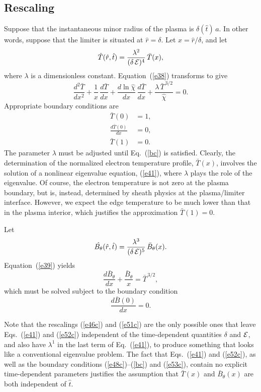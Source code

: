 \documentclass{iopjournal}
\begin{document}
\subsection{Rescaling}
Suppose that the instantaneous minor radius of the plasma is $\delta(\hat{t})\,a$. In other words, suppose that the limiter
is situated at $\hat{r}= \delta$. Let $x=\hat{r}/\delta$, and let
\begin{equation}\label{e46c}
\hat{T}(\hat{r},\hat{t}) = \frac{\lambda^2}{(\delta\,{\cal E})^4}\,\bar{T}(x),
\end{equation}
where $\lambda$ is a dimensionless constant. 
Equation~(\ref{e38}) transforms to give
\begin{equation}\label{e41}
\frac{d^2\bar{T}}{dx^2} + \frac{1}{x}\,\frac{d\bar{T}}{dx} + \frac{d\ln\hat{\chi}}{dx}\,\frac{d\bar{T}}{dx} + \frac{\lambda\,\bar{T}^{\,3/2}}{\hat{\chi}}=0.
\end{equation}
Appropriate boundary conditions are 
\begin{align}\label{e48c}
\bar{T}(0) &=1,\\[0.5ex]
\frac{d\bar{T}(0)}{dx}& = 0,\\[0.5ex]
\bar{T}(1) &= 0.\label{bc}
\end{align}
The parameter $\lambda$ must be adjusted until Eq.~(\ref{bc}) is satisfied. Clearly, the determination of the normalized electron temperature profile, $\bar{T}(x)$, 
involves the solution of a nonlinear eigenvalue equation, (\ref{e41}), where $\lambda$ plays the role of the eigenvalue. Of course, the electron temperature is not zero at the
plasma boundary, but is, instead, determined by sheath physics at the plasma/limiter interface. However, we expect the edge temperature to
be much lower than that in the plasma interior, which justifies the approximation $\bar{T}(1)=0$. 

Let 
\begin{equation}\label{e51c}
\hat{B_\theta}(\hat{r},\hat{t}) = \frac{\lambda^3}{(\delta\,{\cal E})^5}\,\bar{B}_\theta(x).
\end{equation}
Equation~(\ref{e39}) yields 
\begin{equation}\label{e52c}
\frac{d\bar{B}_\theta}{dx} + \frac{\bar{B}_\theta}{x} = \bar{T}^{\,3/2},
\end{equation}
which must be solved subject to the boundary condition
\begin{equation}\label{e53c}
\frac{d\bar{B}(0)}{dx}=0.
\end{equation}

Note that the rescalings (\ref{e46c}) and (\ref{e51c}) are the only possible ones that leave Eqs.~(\ref{e41}) and (\ref{e52c}) independent of the time-dependent quantities 
$\delta$ and ${\cal E}$, and also have $\lambda^1$ in the last term of Eq.~(\ref{e41}), to produce something that looks like a conventional eigenvalue problem.
The fact that Eqs.~(\ref{e41}) and (\ref{e52c}), as well as the boundary conditions (\ref{e48c})--(\ref{bc}) and (\ref{e53c}),  contain no explicit time-dependent parameters justifies the assumption that $\bar{T}(x)$ and $\bar{B}_\theta(x)$ are
both independent of $\hat{t}$. 
\end{document}
